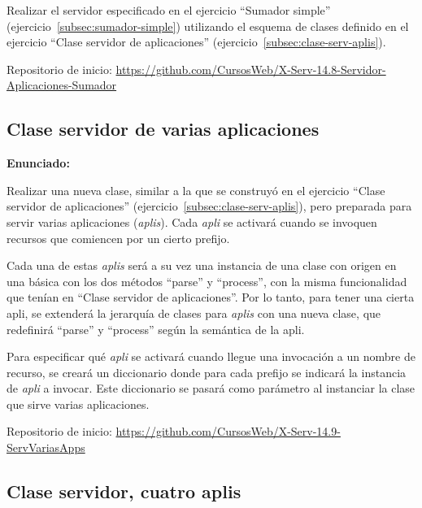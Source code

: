 Realizar el servidor especificado en el ejercicio ``Sumador simple'' (ejercicio~\ref{subsec:sumador-simple}) utilizando el esquema de clases definido en el ejercicio ``Clase servidor de aplicaciones'' (ejercicio~\ref{subsec:clase-serv-aplis}).

Repositorio de inicio: \url{https://github.com/CursosWeb/X-Serv-14.8-Servidor-Aplicaciones-Sumador}

\subsection{Clase servidor de varias aplicaciones}
\label{subsec:clase-serv-aplis-multi}

\textbf{Enunciado:}

Realizar una nueva clase, similar a la que se construyó en el ejercicio ``Clase servidor de aplicaciones'' (ejercicio~\ref{subsec:clase-serv-aplis}), pero preparada para servir varias aplicaciones (\emph{aplis}). Cada \emph{apli} se activará cuando se invoquen recursos que comiencen por un cierto prefijo.

Cada una de estas \emph{aplis} será a su vez una instancia de una clase con origen en una básica con los dos métodos ``parse'' y ``process'', con la misma funcionalidad que tenían en ``Clase servidor de aplicaciones''. Por lo tanto, para tener una cierta apli, se extenderá la jerarquía de clases para \emph{aplis} con una nueva clase, que redefinirá ``parse'' y ``process'' según la semántica de la apli.

Para especificar qué \emph{apli} se activará cuando llegue una invocación a un nombre de recurso, se creará un diccionario donde para cada prefijo se indicará la instancia de \emph{apli} a invocar. Este diccionario se pasará como parámetro al instanciar la clase que sirve varias aplicaciones.

Repositorio de inicio: \url{https://github.com/CursosWeb/X-Serv-14.9-ServVariasApps}

\subsection{Clase servidor, cuatro aplis}
\label{subsec:clase-serv-aplis-varias}

